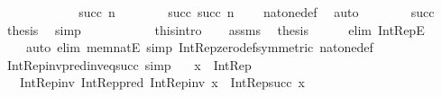 \begin{isabellebody}
\ \ \ \ \isamarkupfalse%
\isanewline
\ \ \ \ \ \ \isamarkupfalse%
\ {\isacharparenleft}{\kern0pt}succ\ n{\isacharparenright}{\kern0pt}\isanewline
\ \ \ \ \ \ \isamarkupfalse%
\ {\isachardoublequoteopen}succ\ {\isacharparenleft}{\kern0pt}succ\ n{\isacharparenright}{\kern0pt}\ {\isasymnoteq}\ {}{\isachardoublequoteclose}\ \isamarkupfalse%
\ nat{\isacharunderscore}{\kern0pt}one{\isacharunderscore}{\kern0pt}def\ \isamarkupfalse%
\ auto\isanewline
\ \ \ \ \ \ \isamarkupfalse%
\ succ\ \isamarkupfalse%
\ {\isacharquery}{\kern0pt}thesis\ \isamarkupfalse%
\ simp\isanewline
\ \ \ \ \isamarkupfalse%
\isanewline
\ \ \isacommand{{\isacharbraceright}{\kern0pt}}\isamarkupfalse%
\isanewline
\ \ \isamarkupfalse%
\ this{\isacharbrackleft}{\kern0pt}intro{\isacharbang}{\kern0pt}{\isacharbrackright}{\kern0pt}\isanewline
\ \ \isamarkupfalse%
\ assms\ \isamarkupfalse%
\ {\isacharquery}{\kern0pt}thesis\isanewline
\ \ \ \ \isamarkupfalse%
\ {\isacharparenleft}{\kern0pt}elim\ Int{\isacharunderscore}{\kern0pt}RepE{\isacharparenright}{\kern0pt}\isanewline
\ \ \ \ {\isacharparenleft}{\kern0pt}auto\ elim{\isacharcolon}{\kern0pt}\ mem{\isacharunderscore}{\kern0pt}natE\ simp{\isacharcolon}{\kern0pt}\ Int{\isacharunderscore}{\kern0pt}Rep{\isacharunderscore}{\kern0pt}zero{\isacharunderscore}{\kern0pt}def{\isacharbrackleft}{\kern0pt}symmetric{\isacharbrackright}{\kern0pt}\ nat{\isacharunderscore}{\kern0pt}one{\isacharunderscore}{\kern0pt}def{\isacharparenright}{\kern0pt}\isanewline
{}\isamarkupfalse%
%
\endisatagproof
{\isafoldproof}%
%
\isadelimproof
\isanewline
%
\endisadelimproof
\isanewline
{}\isamarkupfalse%
\ Int{\isacharunderscore}{\kern0pt}Rep{\isacharunderscore}{\kern0pt}inv{\isacharunderscore}{\kern0pt}pred{\isacharunderscore}{\kern0pt}inv{\isacharunderscore}{\kern0pt}eq{\isacharunderscore}{\kern0pt}succ\ {\isacharbrackleft}{\kern0pt}simp{\isacharbrackright}{\kern0pt}{\isacharcolon}{\kern0pt}\isanewline
\ \ \ {\isachardoublequoteopen}x\ {\isacharcolon}{\kern0pt}\ Int{\isacharunderscore}{\kern0pt}Rep{\isachardoublequoteclose}\isanewline
\ \ \ {\isachardoublequoteopen}Int{\isacharunderscore}{\kern0pt}Rep{\isacharunderscore}{\kern0pt}inv\ {\isacharparenleft}{\kern0pt}Int{\isacharunderscore}{\kern0pt}Rep{\isacharunderscore}{\kern0pt}pred\ {\isacharparenleft}{\kern0pt}Int{\isacharunderscore}{\kern0pt}Rep{\isacharunderscore}{\kern0pt}inv\ x{\isacharparenright}{\kern0pt}{\isacharparenright}{\kern0pt}\ {\isacharequal}{\kern0pt}\ Int{\isacharunderscore}{\kern0pt}Rep{\isacharunderscore}{\kern0pt}succ\ x{\isachardoublequoteclose}\isanewline

\end{isabellebody}

